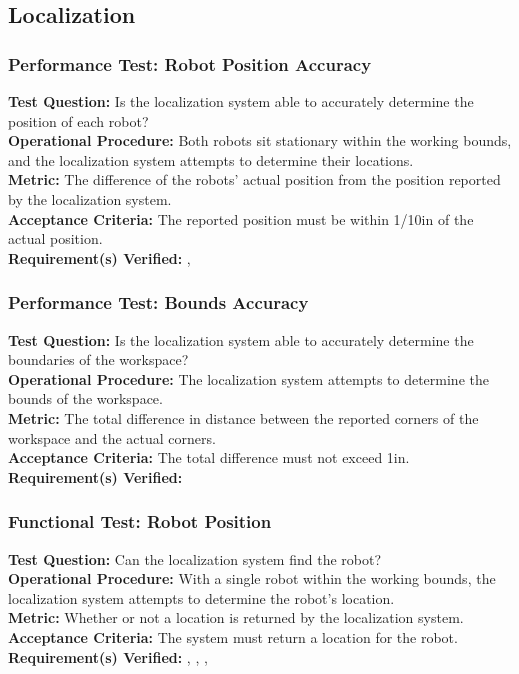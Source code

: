 
\subsection{Localization}
\label{sec:verification_localization}

\subsubsection{Performance Test: Robot Position Accuracy}
\label{test:localization_pt_accuracy}
\textbf{Test Question:} Is the localization system able to accurately determine the position of each robot?\\
\textbf{Operational Procedure:} Both robots sit stationary within the working bounds, and the localization system attempts to determine their locations.\\
\textbf{Metric:} The difference of the robots' actual position from the position reported by the localization system. \\
\textbf{Acceptance Criteria:} The reported position must be within 1/10in of the actual position.\\
\textbf{Requirement(s) Verified:} , 

\subsubsection{Performance Test: Bounds Accuracy}
\label{test:localization_pt_bounds}
\textbf{Test Question:} Is the localization system able to accurately determine the boundaries of the workspace?\\
\textbf{Operational Procedure:} The localization system attempts to determine the bounds of the workspace.\\
\textbf{Metric:} The total difference in distance between the reported corners of the workspace and the actual corners.\\
\textbf{Acceptance Criteria:} The total difference must not exceed 1in.\\
\textbf{Requirement(s) Verified:} 

\subsubsection{Functional Test: Robot Position}
\label{test:localization_ft_robopos}
\textbf{Test Question:} Can the localization system find the robot?\\
\textbf{Operational Procedure:} With a single robot within the working bounds, the localization system attempts to determine the robot's location.\\
\textbf{Metric:} Whether or not a location is returned by the localization system.\\
\textbf{Acceptance Criteria:} The system must return a location for the robot. \\
\textbf{Requirement(s) Verified:} , , , 


